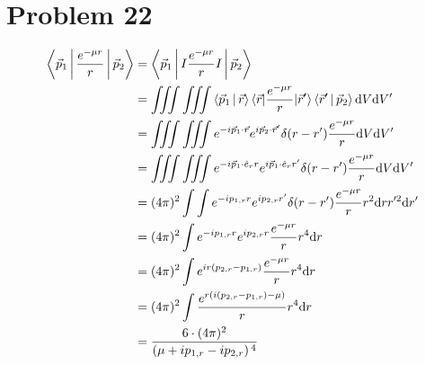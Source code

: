 \documentclass[12pt]{article}
\begin{document}
\section*{Problem 22}
\begin{align*}
\Braket{\vec p_1|\frac{e^{-\mu r}}{r}|\vec p_2} &= \Braket{\vec p_1|I\frac{e^{-\mu r}}{r}I|\vec p_2}\\
&=\iiint\iiint\Braket{\vec p_1|\vec r}\braket{\vec r|\frac{e^{-\mu r}}{r}|\vec r'}\Braket{\vec r'|\vec p_2} \mathrm d V \mathrm dV'\\
&= \iiint \iiint e^{-i\vec p_1\cdot\vec r}e^{i\vec p_2\cdot\vec r'}\delta(r-r')\frac{e^{-\mu r}}{r}\mathrm dV\mathrm dV'\\
&= \iiint \iiint e^{-i\vec p_1\cdot\hat e_r r}e^{i\vec p_1\cdot\hat e_r r'}\delta(r-r')\frac{e^{-\mu r}}{r}\mathrm dV\mathrm dV'\\
&= (4\pi)^2\int\int e^{-i p_{1,r}r}e^{i p_{2,r} r'}\delta(r-r')\frac{e^{-\mu r}}{r}r^2\mathrm drr'^2\mathrm dr'\\
&=(4\pi)^2 \int e^{-i p_{1,r} r}e^{ip_{2,r} r}\frac{e^{-\mu r}}{r}r^4\mathrm dr\\
&= (4\pi)^2\int e^{ir(p_{2,r}-p_{1,r})} \frac{e^{-\mu r}}{r} r^4\mathrm dr\\
&= (4\pi)^2\int \frac{e^{r(i(p_{2,r}-p_{1,r})-\mu)}}{r}r^4\mathrm dr\\
&= \frac{6\cdot (4\pi)^2}{\left(\mu +i p_{1,r}-i p_{2,r}\right){}^4}
\end{align*}
\end{document}
